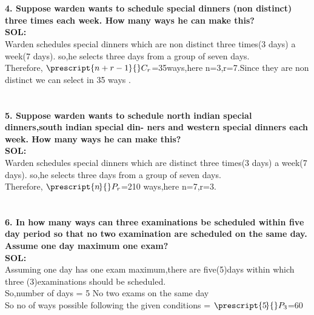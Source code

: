 \documentclass[8pt,a4paper]{article}
\newcommand\Myperm[2][n]{\prescript{#1\mkern-2.5mu}{}P_{#2}}
\newcommand\Mycomb[2][n]{\prescript{#1\mkern-0.5mu}{}C_{#2}}
\begin{document}
\section{}

\textbf{4. Suppose warden wants to schedule special dinners (non distinct) three times each week.
How many ways he can make this?}\\

\textbf{SOL:}\\Warden schedules special dinners which are non distinct three times(3 days) a week(7 days). so,he selects three days from a group of seven days.\\Therefore, $\Mycomb[n+r-1]{r}$=35ways,here n=3,r=7.Since they are non distinct we can select in 35 ways . \\


\section{}

\textbf{5. Suppose warden wants to schedule north indian special dinners,south indian special din-
ners and western special dinners each week. How many ways he can make this?}\\

\textbf{SOL:}\\Warden schedules special dinners which are distinct three times(3 days) a week(7 days). so,he selects three days from a group of seven days.\\Therefore, $\Myperm[n]{r}$=210 ways,here n=7,r=3.\\


\section{}

\textbf{6. In how many ways can three examinations be scheduled within five day period so that no
two examination are scheduled on the same day. Assume one day maximum one exam?}\\

\textbf{SOL:}\\Assuming one day has one exam maximum,there are five(5)days within which three (3)examinations should be scheduled.\\ So,number of days = 5
No two exams on the same day\\
So no  of ways possible following  the given conditions = $\Myperm[5]{3}$=60\\
\end{document}

